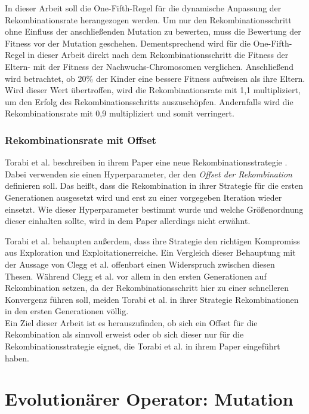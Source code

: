 In dieser Arbeit soll die One-Fifth-Regel für die dynamische Anpassung der Rekombinationsrate herangezogen werden.
Um nur den Rekombinationsschritt ohne Einfluss der anschließenden Mutation zu bewerten, muss die Bewertung der Fitness vor der Mutation geschehen.
Dementsprechend wird für die One-Fifth-Regel in dieser Arbeit direkt nach dem Rekombinationsschritt die Fitness der Eltern- mit der Fitness der Nachwuchs-Chromosomen verglichen.
Anschließend wird betrachtet, ob 20\% der Kinder eine bessere Fitness aufweisen als ihre Eltern.
Wird dieser Wert übertroffen, wird die Rekombinationsrate mit 1,1 multipliziert, um den Erfolg des Rekombinationsschritts auszuschöpfen.
Andernfalls wird die Rekombinationsrate mit 0,9 multipliziert und somit verringert.


\subsubsection{Rekombinationsrate mit Offset}
\label{subsubsec:offsetCrossover}
Torabi et al. beschreiben in ihrem Paper eine neue Rekombinationsstrategie \cite{torabi_using_2022}.
Dabei verwenden sie einen Hyperparameter, der den \emph{Offset der Rekombination} definieren soll.
Das heißt, dass die Rekombination in ihrer Strategie für die ersten Generationen ausgesetzt wird und erst zu einer vorgegeben Iteration wieder einsetzt.
Wie dieser Hyperparameter bestimmt wurde und welche Größenordnung dieser einhalten sollte, wird in dem Paper allerdings nicht erwähnt.

Torabi et al. behaupten außerdem, dass ihre Strategie \glqq den richtigen Kompromiss aus Exploration und Exploitation\grqq\space erreiche. \cite{torabi_using_2022}
Ein Vergleich dieser Behauptung mit der Aussage von Clegg et al. offenbart einen Widerspruch zwischen diesen Thesen.
Während Clegg et al. vor allem in den ersten Generationen auf Rekombination setzen, da der Rekombinationsschritt hier zu einer schnelleren Konvergenz führen soll, meiden Torabi et al. in ihrer Strategie Rekombinationen in den ersten Generationen völlig. \cite{clegg_new_2007, torabi_using_2022}\\
Ein Ziel dieser Arbeit ist es herauszufinden, ob sich ein Offset für die Rekombination als sinnvoll erweist oder ob sich dieser nur für die Rekombinationsstrategie eignet, die Torabi et al. in ihrem Paper eingeführt haben.


\section{Evolutionärer Operator: Mutation}
\label{subsec:Mutation}

